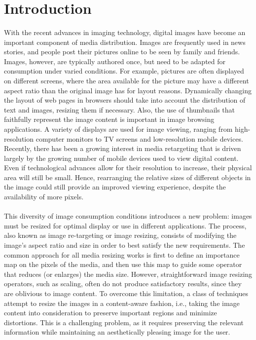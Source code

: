 \documentclass[conference]{acmsiggraph}
\begin{document}
\TOGlinkslist


\copyrightspace

\section{Introduction}

\paragraph{}
With the recent advances in imaging technology, digital images have become an important component of media distribution. Images are frequently used in news stories, and people post their pictures online to be seen by family and friends. Images, however, are typically authored once, but need to be adapted for consumption under varied conditions. For example, pictures are often displayed on different screens, where the area available for the picture may have a different aspect ratio than the original image has for layout reasons. Dynamically changing the layout of web pages in browsers should take into account the distribution of text and images, resizing them if necessary. Also, the use of thumbnails that faithfully represent the image content is important in image browsing applications. A variety of displays are used for image viewing, ranging from high-resolution computer monitors to TV screens and low-resolution mobile devices. Recently, there has been a growing interest in media retargeting that is driven largely by the growing number of mobile devices used to view digital content. Even if technological advances allow for their resolution to increase, their physical area will still be small. Hence, rearranging the relative sizes of different objects in the image could still provide an improved viewing experience, despite the availability of more pixels.

\paragraph{}
This diversity of image consumption conditions introduces a new problem: images must be resized for optimal display or use in different applications. The process, also known as image re-targeting or image resizing, consists of modifying the image's aspect ratio and size in order to best satisfy the new requirements.  The common approach for all media resizing works is first to define an importance map on the pixels of the media, and then use this map to guide some operator that reduces (or enlarges) the media size. However, straightforward image resizing operators, such as scaling, often do not produce satisfactory results, since they are oblivious to image content. To overcome this limitation, a class of techniques attempt to resize the images in a content-aware fashion, i.e., taking the image content into consideration to preserve important regions and minimize distortions. This is a challenging problem, as it requires preserving the relevant information while maintaining an aesthetically pleasing image for the user.
\end{document}
